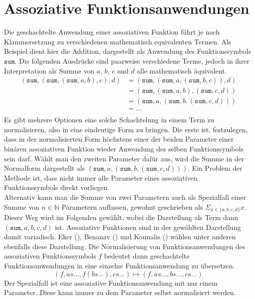 \section {Assoziative Funktionsanwendungen}
Die geschachtelte Anwendung einer assoziativen Funktion führt je nach Klammersetzung zu verschiedenen mathematisch equivalenten Termen. Als Beispiel dient hier die Addition, dargestellt als Anwendung des Funktionssymbols $\texttt{sum}$. Die folgenden Ausdrücke sind paarweise verschiedene Terme, jedoch in ihrer Interpretation als Summe von $a$, $b$, $c$ und $d$ alle mathematisch äquivalent.
\begin{equation*}
	\begin{split}
	   (\texttt{sum}, (\texttt{sum}, (\texttt{sum}, a, b), c), d) 
    &= (\texttt{sum}, (\texttt{sum}, a, (\texttt{sum}, b, c)), d)\\
	&= (\texttt{sum}, (\texttt{sum}, a, b), (\texttt{sum}, c, d))\\
	&= (\texttt{sum}, a, (\texttt{sum}, b, (\texttt{sum}, c, d)))\\
	&= \dots \\
	\end{split}
\end{equation*}
Es gibt mehrere Optionen eine solche Schachtelung in einem Term zu normalisieren, also in eine eindeutige Form zu bringen. Die erste ist, festzulegen, dass in der normalisierten Form höchstens einer der beiden Parameter einer binären assoziativen Funktion wieder Anwendung des selben Funktionssymbols sein darf. Wählt man den zweiten Parameter dafür aus, wird die Summe in der Normalform dargestellt als $(\texttt{sum}, a, (\texttt{sum}, b, (\texttt{sum}, c, d)))$. Ein Problem der Methode ist, dass nicht immer alle Parameter eines assoziativen Funktionssymbols direkt vorliegen.\\
Alternativ kann man die Summe von zwei Parametern auch als Spezialfall einer Summe von $n \in \mathbb{N}$ Parametern auffassen, gewohnt geschrieben als $\Sigma_{x \in \{a, b, c, d\}} x$. Dieser Weg wird im Folgenden gewählt, wobei die Darstellung als Term dann $(\texttt{sum}, a, b, c, d)$ ist. Assoziative Funktionen sind in der gewählten Darstellung damit variadisch. Eker (\cite{BipartiteGraphMatching}), Benanav (\cite{NPHardMatching}) und Kounalis (\cite{ACPatternCompiler}) wählen unter anderen ebenfalls diese Darstellung. 
Die Normalisierung von Funktionsanwendungen des assoziativen Funktionssymbols $f$ bedeutet dann geschachtelte Funktionsanwendungen in eine einzelne Funktionsanwendung zu übersetzen. 
$$(f, as..., f(bs...), cs...) \mapsto (f, as..., bs..., cs...)$$
Der Spezialfall ist eine assoziative Funktionsanwendung mit nur einem Parameter. Diese kann immer zu dem Parameter selbst normalisiert werden. 

